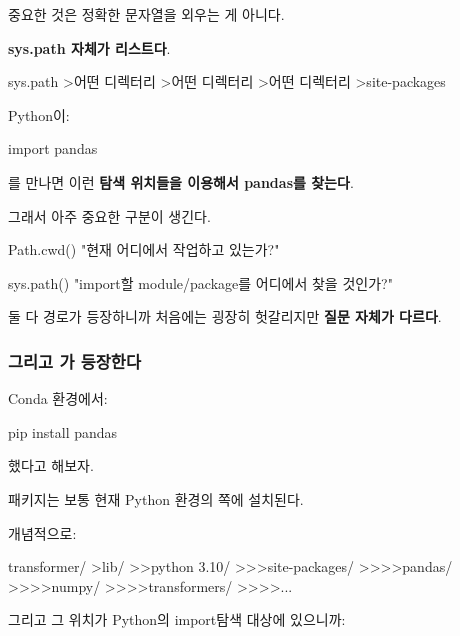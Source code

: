 \begin{dhkzsh}
\end{dhkzsh}

중요한 것은 정확한 문자열을 외우는 게 아니다.

\textbf{sys.path 자체가 리스트다}.

\begin{dhkdir}
sys.path
>어떤 디렉터리
>어떤 디렉터리
>어떤 디렉터리
>site-packages
\end{dhkdir}

Python이:

\begin{dhkcode}
import pandas
\end{dhkcode}

를 만나면 이런 \textbf{탐색 위치들을 이용해서 pandas를 찾는다}.

그래서 아주 중요한 구분이 생긴다.

\begin{dhksmry}[centered]
Path.cwd()
\da
"현재 어디에서 작업하고 있는가?"

sys.path()
\da
"import할 module/package를 어디에서 찾을 것인가?"
\end{dhksmry}

둘 다 경로가 등장하니까 처음에는 굉장히 헛갈리지만 \textbf{질문 자체가 다르다}.

\subsubsection{그리고 가 등장한다}

Conda 환경에서:

\begin{dhkzsh}
pip install pandas
\end{dhkzsh}

했다고 해보자.

패키지는 보통 현재 Python 환경의 쪽에 설치된다.

개념적으로:

\begin{dhkdir}
transformer/
>lib/
>>python 3.10/
>>>site-packages/
>>>>pandas/
>>>>numpy/
>>>>transformers/
>>>>...
\end{dhkdir}

그리고 그 위치가 Python의 import탐색 대상에 있으니까:

